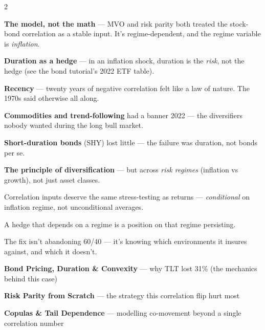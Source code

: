 \documentclass{pyportfolios-note}
\begin{document}
\begin{multicols}{2}
\begin{notebullets}
\item \textbf{The model, not the math} — MVO and risk parity both treated the
      stock-bond correlation as a stable input. It's regime-dependent, and the
      regime variable is \textit{inflation}.
\item \textbf{Duration as a hedge} — in an inflation shock, duration is the
      \textit{risk}, not the hedge (see the bond tutorial's 2022 ETF table).
\item \textbf{Recency} — twenty years of negative correlation felt like a law of
      nature. The 1970s said otherwise all along.
\end{notebullets}

\begin{notebullets}
\item \textbf{Commodities and trend-following} had a banner 2022 — the
      diversifiers nobody wanted during the long bull market.
\item \textbf{Short-duration bonds} (SHY) lost little — the failure was
      duration, not bonds per se.
\item \textbf{The principle of diversification} — but across \textit{risk
      regimes} (inflation vs growth), not just asset classes.
\end{notebullets}

\begin{notebulletsnum}
\item Correlation inputs deserve the same stress-testing as returns —
      \textit{conditional} on inflation regime, not unconditional averages.
\item A hedge that depends on a regime is a position on that regime persisting.
\item The fix isn't abandoning 60/40 — it's knowing which environments it
      insures against, and which it doesn't.
\end{notebulletsnum}

\begin{notebullets}
\item \textbf{Bond Pricing, Duration \& Convexity} — why TLT lost 31\% (the
      mechanics behind this case)
\item \textbf{Risk Parity from Scratch} — the strategy this correlation flip
      hurt most
\item \textbf{Copulas \& Tail Dependence} — modelling co-movement beyond a
      single correlation number
\end{notebullets}
\end{multicols}
\end{document}
